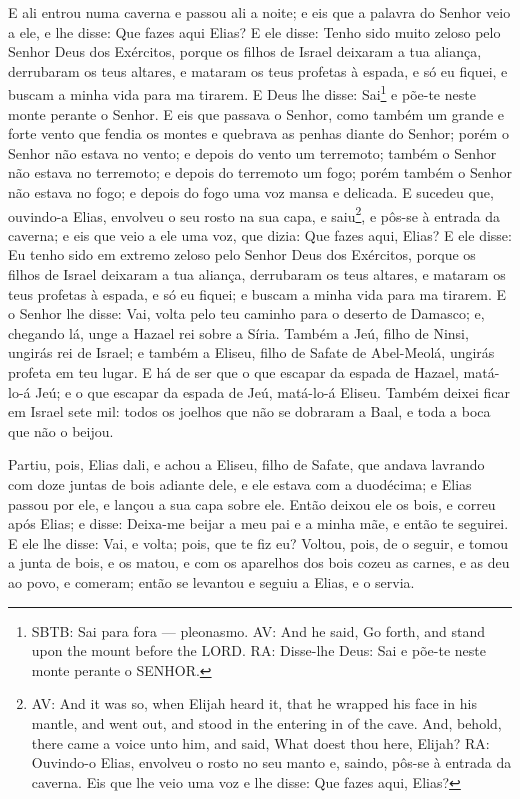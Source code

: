 E ali entrou numa caverna e passou ali a noite; e eis que a
palavra do Senhor veio a ele, e lhe disse: Que fazes aqui Elias?
E ele disse: Tenho sido muito zeloso pelo Senhor Deus dos
Exércitos, porque os filhos de Israel deixaram a tua aliança,
derrubaram os teus altares, e mataram os teus profetas à espada, e
só eu fiquei, e buscam a minha vida para ma tirarem. E Deus
lhe disse: Sai\footnote{SBTB: Sai para fora --- pleonasmo. AV: And
he said, Go forth, and stand upon the mount before the LORD. RA:
Disse-lhe Deus: Sai e põe-te neste monte perante o SENHOR.} e põe-te
neste monte perante o Senhor. E eis que passava o Senhor, como
também um grande e forte vento que fendia os montes e quebrava as
penhas diante do Senhor; porém o Senhor não estava no vento; e
depois do vento um terremoto; também o Senhor não estava no
terremoto; e depois do terremoto um fogo; porém também o
Senhor não estava no fogo; e depois do fogo uma voz mansa e
delicada. E sucedeu que, ouvindo-a Elias, envolveu o seu
rosto na sua capa, e saiu\footnote{AV: And it was so, when Elijah
heard it, that he wrapped his face in his mantle, and went out, and
stood in the entering in of the cave. And, behold, there came a
voice unto him, and said, What doest thou here, Elijah? RA:
Ouvindo-o Elias, envolveu o rosto no seu manto e, saindo, pôs-se à
entrada da caverna. Eis que lhe veio uma voz e lhe disse: Que fazes
aqui, Elias?}, e pôs-se à entrada da caverna; e eis que veio a ele
uma voz, que dizia: Que fazes aqui, Elias? E ele disse: Eu
tenho sido em extremo zeloso pelo Senhor Deus dos Exércitos, porque
os filhos de Israel deixaram a tua aliança, derrubaram os teus
altares, e mataram os teus profetas à espada, e só eu fiquei; e
buscam a minha vida para ma tirarem. E o Senhor lhe disse:
Vai, volta pelo teu caminho para o deserto de Damasco; e, chegando
lá, unge a Hazael rei sobre a Síria. Também a Jeú, filho de
Ninsi, ungirás rei de Israel; e também a Eliseu, filho de Safate de
Abel-Meolá, ungirás profeta em teu lugar. E há de ser que o
que escapar da espada de Hazael, matá-lo-á Jeú; e o que escapar da
espada de Jeú, matá-lo-á Eliseu. Também deixei ficar em
Israel sete mil: todos os joelhos que não se dobraram a Baal, e toda
a boca que não o beijou.

Partiu, pois, Elias dali, e achou a Eliseu, filho de Safate, que
andava lavrando com doze juntas de bois adiante dele, e ele estava
com a duodécima; e Elias passou por ele, e lançou a sua capa sobre
ele. Então deixou ele os bois, e correu após Elias; e disse:
Deixa-me beijar a meu pai e a minha mãe, e então te seguirei. E ele
lhe disse: Vai, e volta; pois, que te fiz eu? Voltou, pois,
de o seguir, e tomou a junta de bois, e os matou, e com os aparelhos
dos bois cozeu as carnes, e as deu ao povo, e comeram; então se
levantou e seguiu a Elias, e o servia.

